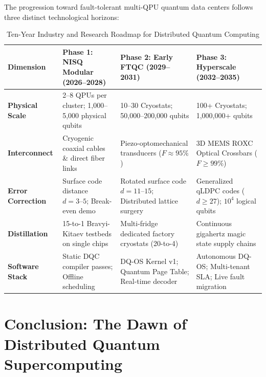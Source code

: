 The progression toward fault-tolerant multi-QPU quantum data centers follows three distinct technological horizons:

\begin{table}[htbp]
    \centering
    \small
    \caption{Ten-Year Industry and Research Roadmap for Distributed Quantum Computing}
    \label{tab:ten_year_roadmap_expanded}
    \begin{tabularx}{\textwidth}{l X X X}
        \toprule
        \textbf{Dimension} & \textbf{Phase 1: NISQ Modular (2026--2028)} & \textbf{Phase 2: Early FTQC (2029--2031)} & \textbf{Phase 3: Hyperscale (2032--2035)} \\
        \midrule
        \textbf{Physical Scale} & 2--8 QPUs per cluster; 1,000--5,000 physical qubits & 10--30 Cryostats; 50,000--200,000 qubits & 100+ Cryostats; 1,000,000+ qubits \\
        \addlinespace
        \textbf{Interconnect} & Cryogenic coaxial cables \& direct fiber links & Piezo-optomechanical transducers ($F \approx 95\%$) & 3D MEMS ROXC Optical Crossbars ($F \ge 99\%$) \\
        \addlinespace
        \textbf{Error Correction} & Surface code distance $d=3\text{--}5$; Break-even demo & Rotated surface code $d=11\text{--}15$; Distributed lattice surgery & Generalized qLDPC codes ($d \ge 27$); $10^4$ logical qubits \\
        \addlinespace
        \textbf{Distillation} & 15-to-1 Bravyi-Kitaev testbeds on single chips & Multi-fridge dedicated factory cryostats (20-to-4) & Continuous gigahertz magic state supply chains \\
        \addlinespace
        \textbf{Software Stack} & Static DQC compiler passes; Offline scheduling & DQ-OS Kernel v1; Quantum Page Table; Real-time decoder & Autonomous DQ-OS; Multi-tenant SLA; Live fault migration \\
        \bottomrule
    \end{tabularx}
\end{table}


\section{Conclusion: The Dawn of Distributed Quantum Supercomputing}
\label{sec:conclusion_vision}

